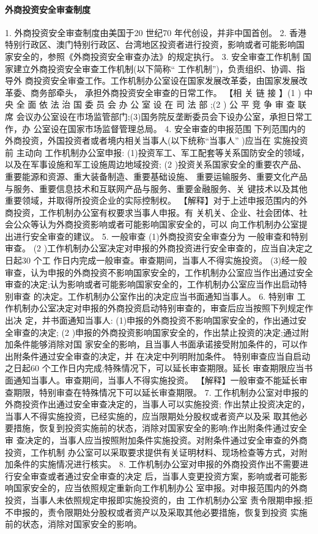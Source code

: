 \documentclass[UTF8,12pt]{ctexart}
\numberwithin{equation}{section} %
\numberwithin{figure}{section}
\numberwithin{table}{section}
\begin{document}
	\paragraph{外商投资安全审查制度}
	1. 外商投资安全审查制度由美国于20 世纪70 年代创设，并非中国首创。
	2. 香港特别行政区、澳门特别行政区、台湾地区投资者进行投资，影响或者可能影响国 家安全的，参照《外商投资安全审查办法》的规定执行。
	3. 安全审查工作机制
	国家建立外商投资安全审查工作机制(以下简称“ 工作机制”)，负责组织、协调、指导外 商投资安全审查工作。工作机制办公室设在国家发展改革委，由国家发展改革委、商务部牵头， 承担外商投资安全审查的日常工作。
	【相 关 链 接 】(1 ) 中 央 全 面 依 法 治 国 委 员 会 办 公 室 设 在 司 法 部 ;(2 ) 公 平 竞 争 审 查 联 席 会议办公室设在市场监管部门;(3)国务院反垄断委员会下设办公室，承担日常工作，办 公室设在国家市场监督管理总局。
	4. 安全审查的申报范围 下列范围内的外商投资，外国投资者或者境内相关当事人(以下统称“当事人” )应当在 实施投资前 主动向 工作机制办公室申报: (1)投资军工、军工配套等关系国防安全的领域，以及在军事设施和军工设施周边地域投资; (2 )投资关系国家安全的重要农产品、重要能源和资源、重大装备制造、重要基础设施、 重要运输服务、重要文化产品与服务、重要信息技术和互联网产品与服务、重要金融服务、关 键技术以及其他重要领域，并取得所投资企业的实际控制权。
	【解释】对于上述申报范围内的外商投资，工作机制办公室有权要求当事人申报。有 关机关、企业、社会团体、社会公众等认为外商投资影响或者可能影响国家安全的，可以 向工作机制办公室提出进行安全审查的建议。
	5. 一般审查
	(1)外商投资安全审查分为 一般审查和特别审查。
	(2 )工作机制办公室决定对申报的外商投资进行安全审查的，应当自决定之日起30 个工 作日内完成一般审查。审查期间，当事人不得实施投资。 (3)经一般审查，认为申报的外商投资不影响国家安全的，工作机制办公室应当作出通过安全审查的决定;认为影响或者可能影响国家安全的，工作机制办公室应当作出启动特别审查 的决定。工作机制办公室作出的决定应当书面通知当事人。
	6. 特别审 工作机制办公室决定对申报的外商投资启动特别审查的，审查后应当按照下列规定作出决 定，并书面通知当事人: (1)申报的外商投资不影响国家安全的，作出通过安全审查的决定;
	(2 )申报的外商投资影响国家安全的，作出禁止投资的决定;通过附加条件能够消除对国 家安全的影响，且当事人书面承诺接受附加条件的，可以作出附条件通过安全审查的决定，并 在决定中列明附加条件。
	特别审查应当自启动之日起60 个工作日内完成;特殊情况下，可以延长审查期限。延长 审查期限应当书面通知当事人。审查期间，当事人不得实施投资。
	【解释】一般审查不能延长审查期限，特别审查在特殊情况下可以延长审查期限。
	7. 工作机制办公室对申报的外商投资作出通过安全审查决定的，当事人可以实施投资; 作出禁止投资决定的，当事人不得实施投资，已经实施的，应当限期处分股权或者资产以及采 取其他必要措施，恢复到投资实施前的状态，消除对国家安全的影响;作出附条件通过安全审 查决定的，当事人应当按照附加条件实施投资。对附条件通过安全审查的外商投资，工作机制 办公室可以采取要求提供有关证明材料、现场检查等方式，对附加条件的实施情况进行核实。 8. 工作机制办公室对申报的外商投资作出不需要进行安全审查或者通过安全审查的决定 后，当事人变更投资方案，影响或者可能影响国家安全的，应当依照规定重新向工作机制办公 室申报。对申报范围内的外商投资，当事人未依照规定申报即实施投资的，由 工作机制办公室 责令限期申报;拒不申报的，责令限期处分股权或者资产以及采取其他必要措施，恢复到投资 实施前的状态，消除对国家安全的影响。
	
\end{document}
